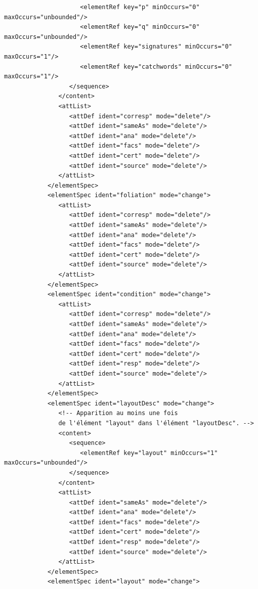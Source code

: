\documentclass[a4paper,12pt,twoside]{book}
\begin{document}
\begin{verbatim}
                     <elementRef key="p" minOccurs="0" maxOccurs="unbounded"/>
                     <elementRef key="q" minOccurs="0" maxOccurs="unbounded"/>
                     <elementRef key="signatures" minOccurs="0" maxOccurs="1"/>
                     <elementRef key="catchwords" minOccurs="0" maxOccurs="1"/>
                  </sequence>
               </content>
               <attList>
                  <attDef ident="corresp" mode="delete"/>
                  <attDef ident="sameAs" mode="delete"/>
                  <attDef ident="ana" mode="delete"/>
                  <attDef ident="facs" mode="delete"/>
                  <attDef ident="cert" mode="delete"/>
                  <attDef ident="source" mode="delete"/>
               </attList>
            </elementSpec>
            <elementSpec ident="foliation" mode="change">
               <attList>
                  <attDef ident="corresp" mode="delete"/>
                  <attDef ident="sameAs" mode="delete"/>
                  <attDef ident="ana" mode="delete"/>
                  <attDef ident="facs" mode="delete"/>
                  <attDef ident="cert" mode="delete"/>
                  <attDef ident="source" mode="delete"/>
               </attList>
            </elementSpec>
            <elementSpec ident="condition" mode="change">
               <attList>
                  <attDef ident="corresp" mode="delete"/>
                  <attDef ident="sameAs" mode="delete"/>
                  <attDef ident="ana" mode="delete"/>
                  <attDef ident="facs" mode="delete"/>
                  <attDef ident="cert" mode="delete"/>
                  <attDef ident="resp" mode="delete"/>
                  <attDef ident="source" mode="delete"/>
               </attList>
            </elementSpec>
            <elementSpec ident="layoutDesc" mode="change">
               <!-- Apparition au moins une fois 
               de l'élément "layout" dans l'élément "layoutDesc". -->
               <content>
                  <sequence>
                     <elementRef key="layout" minOccurs="1" maxOccurs="unbounded"/>
                  </sequence>
               </content>
               <attList>
                  <attDef ident="sameAs" mode="delete"/>
                  <attDef ident="ana" mode="delete"/>
                  <attDef ident="facs" mode="delete"/>
                  <attDef ident="cert" mode="delete"/>
                  <attDef ident="resp" mode="delete"/>
                  <attDef ident="source" mode="delete"/>
               </attList>
            </elementSpec>
            <elementSpec ident="layout" mode="change">

\end{verbatim}
\end{document}
